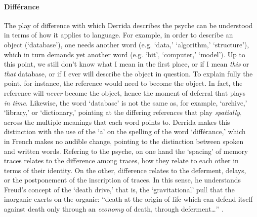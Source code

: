 \paragraph{Différance}
The play of difference with which Derrida describes the psyche can be understood in terms of how it applies to language. For example, in order to describe an object (`database'), one needs another word (e.g. `data,' `algorithm,' `structure'), which in turn demands yet another word (e.g. `bit', `computer,' `model'). Up to this point, we still don't know what I mean in the first place, or if I mean \textit{this} or \textit{that} database, or if I ever will describe the object in question. To explain fully the point, for instance, the reference would need to become the object. In fact, the reference will \textit{never} become the object, hence the moment of deferral that plays \textit{in time}. Likewise, the word `database' is not the same as, for example, `archive,' `library,' or `dictionary,' pointing at the differing references that play \textit{spatially}, across the multiple meanings that each word points to. Derrida makes this distinction with the use of the `a' on the spelling of the word `différance,' which in French makes no audible change, pointing to the distinction between spoken and written words. Refering to the psyche, on one hand the `spacing' of memory traces relates to the difference among traces, how they relate to each other in terms of their identity. On the other, difference relates to the deferment, delays, or the postponement of the inscription of traces. In this sense, he understands Freud's concept of the `death drive,' that is, the `gravitational' pull that the inorganic exerts on the organic: ``death at the origin of life which can defend itself against death only through an \textit{economy} of death, through deferment\dots'' \parencite[202]{Der78:Wri}. 

